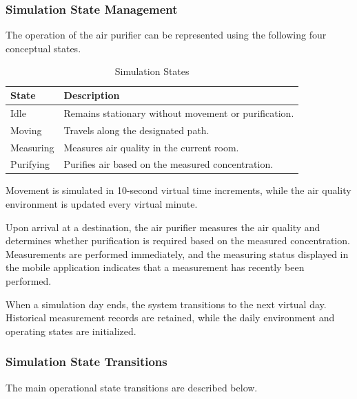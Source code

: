 \documentclass[conference]{IEEEtran}
\newlength{\tablebodywidth}
\begin{document}
\subsubsection{Simulation State Management}

The operation of the air purifier can be represented using the following four conceptual states.

\begin{table}[!t]
\caption{Simulation States}
\label{tab:t16}
\centering\footnotesize
\setlength{\tabcolsep}{3pt}
\setlength{\tablebodywidth}{\dimexpr\columnwidth-12pt\relax}
\begin{tabular}{>{\raggedright\arraybackslash}p{0.260\tablebodywidth}>{\raggedright\arraybackslash}p{0.740\tablebodywidth}}
\toprule
\textbf{State} & \textbf{Description} \\
\midrule
Idle & Remains stationary without movement or purification. \\
Moving & Travels along the designated path. \\
Measuring & Measures air quality in the current room. \\
Purifying & Purifies air based on the measured concentration. \\
\bottomrule
\end{tabular}
\end{table}

Movement is simulated in 10-second virtual time increments, while the air quality environment is updated every virtual minute.

Upon arrival at a destination, the air purifier measures the air quality and determines whether purification is required based on the measured concentration. Measurements are performed immediately, and the measuring status displayed in the mobile application indicates that a measurement has recently been performed.

When a simulation day ends, the system transitions to the next virtual day. Historical measurement records are retained, while the daily environment and operating states are initialized.

\subsubsection{Simulation State Transitions}

The main operational state transitions are described below.
\end{document}

